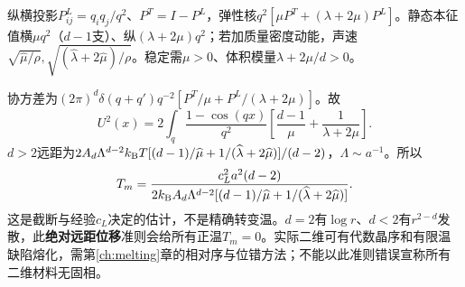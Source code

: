 \begin{solution}
纵横投影$P^L_{ij}=q_iq_j/q^2$、$P^T=I-P^L$，弹性核$q^2[\mu P^T+(\lambda+2\mu)P^L]$。静态本征值横$\mu q^2$（$d-1$支）、纵$(\lambda+2\mu)q^2$；若加质量密度动能，声速$\sqrt{\widehat\mu/\rho},\sqrt{(\widehat\lambda+2\widehat\mu)/\rho}$。稳定需$\mu>0$、体积模量$\lambda+2\mu/d>0$。

协方差为$(2\pi)^d\delta(q+q')q^{-2}[P^T/\mu+P^L/(\lambda+2\mu)]$。故
\begin{equation}
U^2(x)=2\int_q\frac{1-\cos(qx)}{q^2}\left[\frac{d-1}{\mu}+\frac1{\lambda+2\mu}\right].
\end{equation}
$d>2$远距为$2A_d\Lambda^{d-2}k_{\mathrm B} T[(d-1)/\widehat\mu+1/(\widehat\lambda+2\widehat\mu)]/(d-2)$，$\Lambda\sim a^{-1}$。所以
\begin{equation}
T_m=\frac{c_L^2a^2(d-2)}{2k_{\mathrm B} A_d\Lambda^{d-2}[(d-1)/\widehat\mu+1/(\widehat\lambda+2\widehat\mu)]}.
\end{equation}
这是截断与经验$c_L$决定的估计，不是精确转变温。$d=2$有$\log r$、$d<2$有$r^{2-d}$发散，此\textbf{绝对远距位移}准则会给所有正温$T_m=0$。实际二维可有代数晶序和有限温缺陷熔化，需第\ref{ch:melting}章的相对序与位错方法；不能以此准则错误宣称所有二维材料无固相。
\end{solution}
